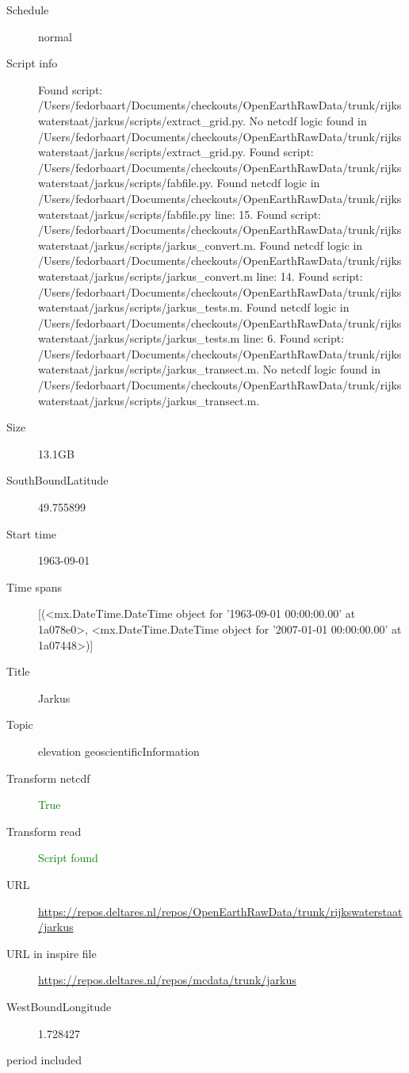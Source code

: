 \documentclass[9]{report}
\begin{document}
\begin{description}
\begin{verbatim}
\end{verbatim}
  \item[Schedule] normal
  \item[Script info] Found script: /Users/fedorbaart/Documents/checkouts/OpenEarthRawData/trunk/rijkswaterstaat/jarkus/scripts/extract\_grid.py.
No netcdf logic found in /Users/fedorbaart/Documents/checkouts/OpenEarthRawData/trunk/rijkswaterstaat/jarkus/scripts/extract\_grid.py.
Found script: /Users/fedorbaart/Documents/checkouts/OpenEarthRawData/trunk/rijkswaterstaat/jarkus/scripts/fabfile.py.
Found netcdf logic in /Users/fedorbaart/Documents/checkouts/OpenEarthRawData/trunk/rijkswaterstaat/jarkus/scripts/fabfile.py line: 15.
Found script: /Users/fedorbaart/Documents/checkouts/OpenEarthRawData/trunk/rijkswaterstaat/jarkus/scripts/jarkus\_convert.m.
Found netcdf logic in /Users/fedorbaart/Documents/checkouts/OpenEarthRawData/trunk/rijkswaterstaat/jarkus/scripts/jarkus\_convert.m line: 14.
Found script: /Users/fedorbaart/Documents/checkouts/OpenEarthRawData/trunk/rijkswaterstaat/jarkus/scripts/jarkus\_tests.m.
Found netcdf logic in /Users/fedorbaart/Documents/checkouts/OpenEarthRawData/trunk/rijkswaterstaat/jarkus/scripts/jarkus\_tests.m line: 6.
Found script: /Users/fedorbaart/Documents/checkouts/OpenEarthRawData/trunk/rijkswaterstaat/jarkus/scripts/jarkus\_transect.m.
No netcdf logic found in /Users/fedorbaart/Documents/checkouts/OpenEarthRawData/trunk/rijkswaterstaat/jarkus/scripts/jarkus\_transect.m.
  \item[Size] 13.1GB
  \item[SouthBoundLatitude] 49.755899
  \item[Start time] 1963-09-01
  \item[Time spans] [(<mx.DateTime.DateTime object for '1963-09-01 00:00:00.00' at 1a078e0>, <mx.DateTime.DateTime object for '2007-01-01 00:00:00.00' at 1a07448>)]
  \item[Title]  Jarkus 
  \item[Topic] elevation geoscientificInformation
  \item[Transform netcdf] \textcolor{green}{True}
  \item[Transform read] \textcolor{green}{Script found}
  \item[URL] \href{https://repos.deltares.nl/repos/OpenEarthRawData/trunk/rijkswaterstaat/jarkus}{https://repos.deltares.nl/repos/OpenEarthRawData/trunk/rijkswaterstaat/jarkus}
  \item[URL in inspire file] \href{https://repos.deltares.nl/repos/mcdata/trunk/jarkus}{https://repos.deltares.nl/repos/mcdata/trunk/jarkus}
  \item[WestBoundLongitude] 1.728427
  \item[period included] 
\end{description}
\end{document}
